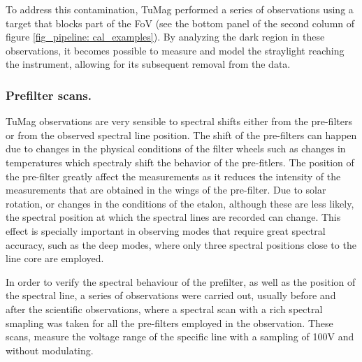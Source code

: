 To address this contamination, TuMag performed a series of observations using a target that blocks part of the FoV (see the bottom panel of the second column of figure \ref{fig_pipeline: cal_examples}). By analyzing the dark region in these observations, it becomes possible to measure and model the straylight reaching the instrument, allowing for its subsequent removal from the data.

\subsubsection{Prefilter scans.}

TuMag observations are very sensible to spectral shifts either from the pre-filters or from the observed spectral line position. The shift of the pre-filters can happen due to changes in the physical conditions of the filter wheels such as changes in temperatures which spectraly shift the behavior of the pre-fitlers. The position of the pre-filter greatly affect the measurements as it reduces the intensity of the measurements that are obtained in the wings of the pre-filter. Due to solar rotation, or changes in the conditions of the etalon, although these are less likely, the spectral position at which the spectral lines are recorded can change. This effect is specially important in observing modes that require great spectral accuracy, such as the deep modes, where only three spectral positions close to the line core are employed. 

In order to verify the spectral behaviour of the prefilter, as well as the position of the spectral line, a series of observations were carried out, usually before and after the scientific observations, where a spectral scan with a rich spectral smapling was taken for all the pre-filters employed in the observation. These scans, measure the voltage range of the specific line with a sampling of 100V and without modulating. 

